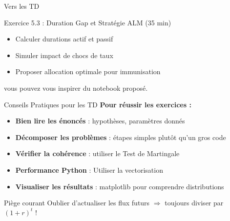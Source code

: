 \documentclass[10pt,aspectratio=169,xcolor={dvipsnames}]{beamer}
\begin{document}
\begin{frame}{Vers les TD}
\begin{block}{Exercice 5.3 : Duration Gap et Stratégie ALM (35 min)}
\begin{itemize}
    \item Calculer durations actif et passif
    \item Simuler impact de chocs de taux
    \item Proposer allocation optimale pour immunisation
\end{itemize}
\end{block}


\vspace{0.5cm}
vous pouvez vous inspirer du notebook proposé.
\end{frame}

\begin{frame}{Conseils Pratiques pour les TD}
\textbf{Pour réussir les exercices :}

\begin{itemize}
    \item \textbf{Bien lire les énoncés} : hypothèses, paramètres donnés
    \item \textbf{Décomposer les problèmes} : étapes simples plutôt qu'un gros code
    \item \textbf{Vérifier la cohérence} : utiliser le Test de Martingale
    \item \textbf{Performance Python} : Utiliser la vectorisation
    \item \textbf{Visualiser les résultats} : matplotlib pour comprendre distributions
\end{itemize}

\vspace{0.3cm}
\begin{alertblock}{Piège courant}
Oublier d'actualiser les flux futurs $\Rightarrow$ toujours diviser par $(1+r)^t$ !
\end{alertblock}

\vspace{0.3cm}
\end{frame}
\end{document}
